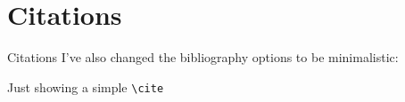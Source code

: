\documentclass[aspectratio=169]{beamer}
\begin{document}
\section{Citations}
\begin{frame}[allowframebreaks]{Citations}
	I've also changed the bibliography options to be minimalistic:

	Just showing a simple \texttt{\textbackslash{}cite} \cite{AlexNet}
	\vfill
	\printbibliography
\end{frame}


\end{document}
